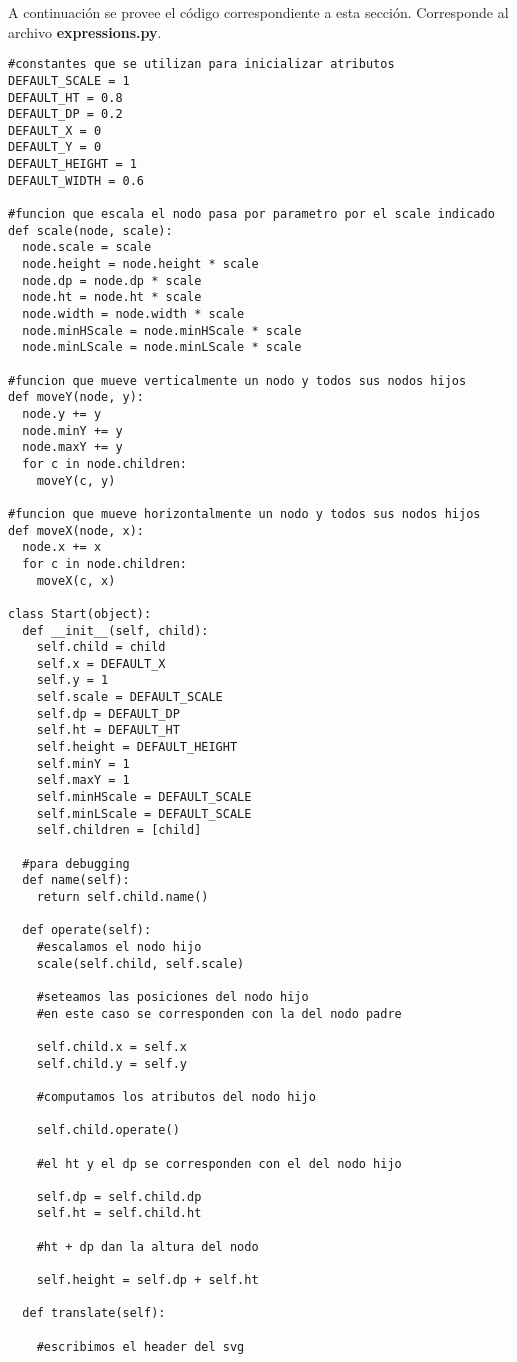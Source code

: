 \indent A continuación se provee el código correspondiente a esta sección. Corresponde al archivo \textbf{expressions.py}.
\begin{verbatim}
#constantes que se utilizan para inicializar atributos
DEFAULT_SCALE = 1
DEFAULT_HT = 0.8
DEFAULT_DP = 0.2
DEFAULT_X = 0
DEFAULT_Y = 0
DEFAULT_HEIGHT = 1
DEFAULT_WIDTH = 0.6

#funcion que escala el nodo pasa por parametro por el scale indicado
def scale(node, scale):
  node.scale = scale
  node.height = node.height * scale
  node.dp = node.dp * scale
  node.ht = node.ht * scale
  node.width = node.width * scale
  node.minHScale = node.minHScale * scale
  node.minLScale = node.minLScale * scale

#funcion que mueve verticalmente un nodo y todos sus nodos hijos
def moveY(node, y):
  node.y += y
  node.minY += y
  node.maxY += y
  for c in node.children:
    moveY(c, y)

#funcion que mueve horizontalmente un nodo y todos sus nodos hijos
def moveX(node, x):
  node.x += x
  for c in node.children:
    moveX(c, x)

class Start(object):
  def __init__(self, child):
    self.child = child
    self.x = DEFAULT_X
    self.y = 1
    self.scale = DEFAULT_SCALE
    self.dp = DEFAULT_DP
    self.ht = DEFAULT_HT
    self.height = DEFAULT_HEIGHT
    self.minY = 1
    self.maxY = 1
    self.minHScale = DEFAULT_SCALE
    self.minLScale = DEFAULT_SCALE
    self.children = [child]

  #para debugging
  def name(self):
    return self.child.name()

  def operate(self):
    #escalamos el nodo hijo
    scale(self.child, self.scale)

    #seteamos las posiciones del nodo hijo 
    #en este caso se corresponden con la del nodo padre

    self.child.x = self.x
    self.child.y = self.y

    #computamos los atributos del nodo hijo

    self.child.operate()

    #el ht y el dp se corresponden con el del nodo hijo

    self.dp = self.child.dp
    self.ht = self.child.ht

    #ht + dp dan la altura del nodo

    self.height = self.dp + self.ht

  def translate(self):

    #escribimos el header del svg


\end{verbatim}

